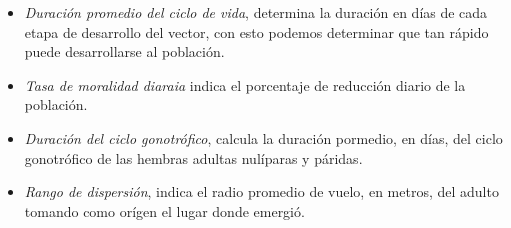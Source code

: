 \begin{itemize}
\item \textit{Duración promedio del ciclo de vida}, determina la duración en días de cada etapa de desarrollo del vector, con esto podemos determinar que tan rápido puede desarrollarse al población.

\item \textit{Tasa de moralidad diaraia} indica el porcentaje de reducción diario de la población.

\item \textit{Duración del ciclo gonotrófico}, calcula la duración pormedio, en días, del ciclo gonotrófico de las hembras adultas nulíparas y páridas.

\item \textit{Rango de dispersión}, indica el radio promedio de vuelo, en metros, del adulto tomando como orígen el lugar donde emergió.

\end{itemize}
